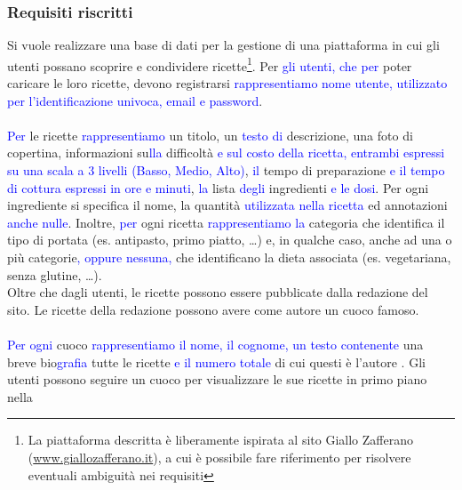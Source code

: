 \documentclass[12pt]{extarticle}
\begin{document}
\subsubsection{Requisiti riscritti}
Si vuole realizzare una base di dati per la gestione di una piattaforma in cui gli utenti possano
scoprire e condividere ricette\footnote{La piattaforma descritta è liberamente ispirata al sito Giallo Zafferano 
(\url{www.giallozafferano.it}), a cui è possibile fare riferimento per risolvere eventuali ambiguità nei requisiti}.
Per \textcolor{blue}{gli utenti, che per} poter caricare le loro ricette,  devono registrarsi 
\textcolor{blue}{rappresentiamo nome utente, utilizzato per l'identificazione univoca, email e password}.
\\\\
\textcolor{blue}{Per} le ricette \textcolor{blue}{rappresentiamo}  un titolo, un \textcolor{blue}{testo di} descrizione, una foto di copertina,  informazioni su\textcolor{blue}{lla} difficoltà
\textcolor{blue}{e sul costo della ricetta, entrambi espressi su una scala a 3 livelli (Basso, Medio, Alto)},
\textcolor{blue}{il} tempo di preparazione \textcolor{blue}{e il tempo di cottura espressi in ore e minuti},  \textcolor{blue}{la} lista  \textcolor{blue}{degli} ingredienti \textcolor{blue}{e le dosi}. 
Per ogni ingrediente si specifica il nome, la quantità \textcolor{blue}{utilizzata nella ricetta} ed  annotazioni \textcolor{blue}{anche nulle}.
Inoltre, \textcolor{blue}{per} ogni ricetta  \textcolor{blue}{rappresentiamo la} categoria che identifica il tipo di portata (es. antipasto, primo piatto, \dots) e, in qualche caso, anche
ad una o più categorie\textcolor{blue}{, oppure nessuna,} che identificano la dieta associata (es. vegetariana, senza glutine, \dots). 
\\
Oltre che dagli utenti, le ricette possono essere pubblicate dalla redazione del sito. Le ricette della
redazione possono avere come autore un cuoco famoso.
\\\\
 \textcolor{blue}{Per ogni} cuoco  
\textcolor{blue}{rappresentiamo il nome, il cognome, un testo contenente} una
breve bio\textcolor{blue}{grafia}  tutte le ricette \textcolor{blue}{e il numero totale} di cui questi è l’autore . Gli utenti possono seguire un cuoco per visualizzare le sue ricette in primo piano nella
\end{document}
